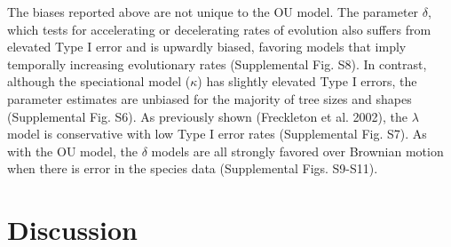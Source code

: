 \documentclass[a4paper,12pt]{article}
\begin{document}


The biases reported above are not unique to the OU model. The parameter $\delta$, which tests for accelerating or decelerating rates of evolution \citep{Pagel:1997aa,Pagel:1999aa} also suffers from elevated Type I error and is upwardly biased, favoring models that imply temporally increasing evolutionary rates (Supplemental Fig. S8). In contrast, although the speciational model ($\kappa$) has slightly elevated Type I errors, the parameter estimates are unbiased for the majority of tree sizes and shapes (Supplemental Fig. S6). As previously shown (Freckleton et al. 2002), the $\lambda$ model is conservative with low Type I error rates (Supplemental Fig. S7). As with the OU model, the $\delta$ models are all strongly favored over Brownian motion when there is error in the species data (Supplemental Figs. S9-S11). 

\section{Discussion}
\label{section:discussion}
\end{document}
